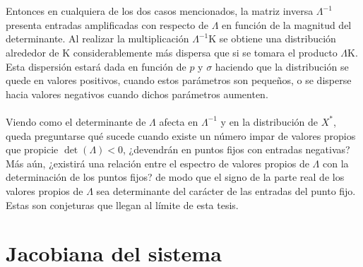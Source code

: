 \\
\\
Entonces en cualquiera de los dos casos mencionados, la matriz inversa $\Lambda^{-1}$ presenta entradas amplificadas con respecto de $\Lambda$ en función de la magnitud del determinante. Al realizar la multiplicación $\Lambda^{-1}\mathrm{K}$ se obtiene una distribución alrededor de $\mathrm{K}$ considerablemente más dispersa que si se tomara el producto $\Lambda\mathrm{K}$. Esta dispersión estará dada en función de $p$ y $\sigma$ haciendo que la distribución se quede en valores positivos, cuando estos parámetros son pequeños, o se disperse hacia valores negativos cuando dichos parámetros aumenten.\\
\\
Viendo como el determinante de $\Lambda$ afecta en $\Lambda^{-1}$ y en la distribución de $X^*$, queda preguntarse qué sucede cuando existe un número impar de valores propios que propicie $\det(\Lambda)<0$, ¿devendrán en puntos fijos con entradas negativas? Más aún, ¿existirá una relación entre el espectro de valores propios de $\Lambda$ con la determinación de los puntos fijos? de modo que el signo de la parte real de los valores propios de $\Lambda$ sea determinante del carácter de las entradas del punto fijo. Estas son conjeturas que llegan al límite de esta tesis.
\newpage
\section{Jacobiana del sistema}

